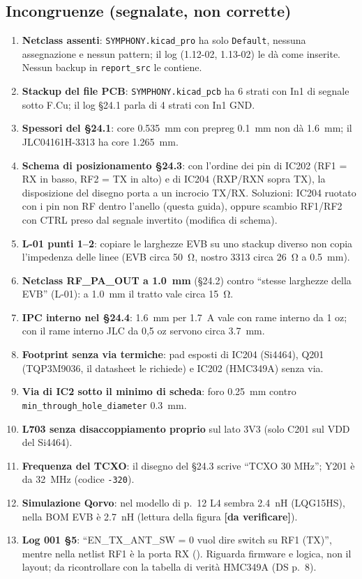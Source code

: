 \documentclass[a4paper,10pt]{article}
\newcommand{\net}[1]{\texttt{\detokenize{#1}}}
\newcommand{\dv}{\textcolor{verfr}{\textbf{[da verificare]}}}
\begin{document}
\subsection{Incongruenze (segnalate, non corrette)}
\begin{enumerate}
\item \textbf{Netclass assenti}: \texttt{SYMPHONY.kicad\_pro} ha solo \texttt{Default}, nessuna assegnazione
      e nessun pattern; il log (1.12-02, 1.13-02) le dà come inserite. Nessun backup in
      \texttt{report\_src} le contiene.
\item \textbf{Stackup del file PCB}: \texttt{SYMPHONY.kicad\_pcb} ha 6 strati con In1 di segnale sotto F.Cu;
      il log \S24.1 parla di 4 strati con In1 GND.
\item \textbf{Spessori del \S24.1}: core \SI{0.535}{mm} con prepreg \SI{0.1}{mm} non dà \SI{1.6}{mm}; il
      JLC04161H-3313 ha core \SI{1.265}{mm}.
\item \textbf{Schema di posizionamento \S24.3}: con l'ordine dei pin di IC202 (RF1 = RX in basso, RF2 = TX in
      alto) e di IC204 (RXP/RXN sopra TX), la disposizione del disegno porta a un incrocio TX/RX. Soluzioni:
      IC204 ruotato con i pin non RF dentro l'anello (questa guida), oppure scambio RF1/RF2 con CTRL preso
      dal segnale invertito (modifica di schema).
\item \textbf{L-01 punti 1--2}: copiare le larghezze EVB su uno stackup diverso non copia l'impedenza delle
      linee (EVB circa \SI{50}{\ohm}, nostro 3313 circa \SI{26}{\ohm} a \SI{0.5}{mm}).
\item \textbf{Netclass RF\_PA\_OUT a \SI{1.0}{mm}} (\S24.2) contro \enquote{stesse larghezze della EVB} (L-01):
      a \SI{1.0}{mm} il tratto vale circa \SI{15}{\ohm}.
\item \textbf{IPC interno nel \S24.4}: \SI{1.6}{mm} per \SI{1.7}{A} vale con rame interno da 1 oz; con il
      rame interno JLC da 0,5 oz servono circa \SI{3.7}{mm}.
\item \textbf{Footprint senza via termiche}: pad esposti di IC204 (Si4464), Q201 (TQP3M9036, il datasheet
      le richiede) e IC202 (HMC349A) senza via.
\item \textbf{Via di IC2 sotto il minimo di scheda}: foro \SI{0.25}{mm} contro \texttt{min\_through\_hole\_diameter}
      \SI{0.3}{mm}.
\item \textbf{L703 senza disaccoppiamento proprio} sul lato 3V3 (solo C201 sul VDD del Si4464).
\item \textbf{Frequenza del TCXO}: il disegno del \S24.3 scrive \enquote{TCXO 30 MHz}; Y201 è da
      \SI{32}{MHz} (codice \texttt{-320}).
\item \textbf{Simulazione Qorvo}: nel modello di p.~12 L4 sembra \SI{2.4}{nH} (LQG15HS), nella BOM EVB è
      \SI{2.7}{nH} (lettura della figura \dv).
\item \textbf{Log 001 \S5}: \enquote{EN\_TX\_ANT\_SW = 0 vuol dire switch su RF1 (TX)}, mentre nella netlist
      RF1 è la porta RX (\net{RF_SW_RX}). Riguarda firmware e logica, non il layout; da ricontrollare con la
      tabella di verità HMC349A (DS p.~8).
\end{enumerate}
\end{document}

